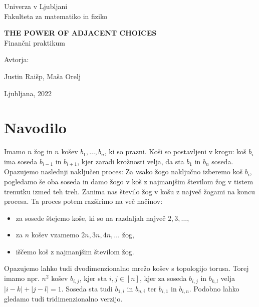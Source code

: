 \documentclass[a4paper, 11pt]{article}
\begin{document}
\thispagestyle{empty}
\begin{center}
\begin{minipage}{0.75\linewidth}
    \centering
    {\Large Univerza v Ljubljani \\ Fakulteta za matematiko in fiziko}
    \\
    \vspace{7cm}

    {\uppercase{\Large \textbf{The power of adjacent choices}}} \\ Finančni praktikum \\
    \vspace{3cm}

    Avtorja:\\
    {\Large Justin Raišp, Maša Orelj\par}
    \vspace{7cm}

    {\Large Ljubljana, 2022}
\end{minipage}
\end{center}

\newpage
 
\section{Navodilo}

Imamo $n$ žog in $n$ košev $b_1, \dots , b_n$, ki so prazni. Koši so postavljeni v krogu: koš $b_i$ ima soseda 
$b_{i-1}$ in $b_{i+1}$, kjer zaradi krožnosti velja, da sta $b_1$ in $b_n$ soseda.
Opazujemo naslednji naključen proces: Za vsako žogo naključno izberemo koš $b_i$, pogledamo še oba soseda in damo žogo 
v koš z najmanjšim številom žog v tistem trenutku izmed teh treh. Zanima nas število žog v košu z največ žogami na koncu procesa. 
Ta proces potem razširimo na več načinov:
\begin{itemize}
    \item za sosede štejemo koše, ki so na razdaljah največ $2, 3, \dots$,
    \item za $n$ košev vzamemo $2n, 3n, 4n, \dots$ žog,
    \item iščemo koš z najmanjšim številom žog.
\end{itemize}  
Opazujemo lahko tudi dvodimenzionalno mrežo košev s topologijo torusa. Torej imamo npr. $n^2$ košev $b_{i,j}$, kjer sta 
$i, j \in [n]$, kjer za soseda $b_{i,j}$ in $b_{k,l}$ velja $|i - k| + |j - l| = 1$. Soseda sta tudi
$b_{1,i}$ in $b_{n,i}$  ter $b_{i,1}$ in $b_{i,n}$. Podobno lahko gledamo tudi tridimenzionalno verzijo.
\end{document}
